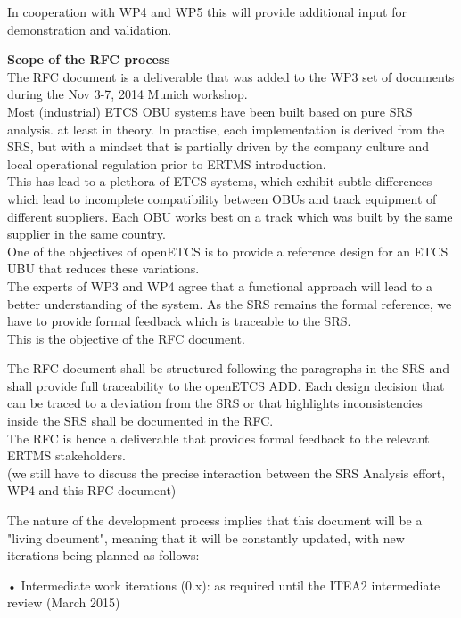 In cooperation with WP4 and WP5 this will provide additional input for demonstration and validation.



\textbf{Scope of the RFC process}\\


The RFC document is a deliverable that was added to the WP3 set of documents during the Nov 3-7, 2014 Munich workshop.\\

Most (industrial) ETCS OBU systems have been built based on pure SRS analysis. at least in theory. In practise, each implementation is derived from the SRS, but with a mindset that is partially driven by the company culture and local operational regulation prior to ERTMS introduction.\\
This has lead to a plethora of ETCS systems, which exhibit subtle differences which lead to incomplete compatibility between OBUs and track equipment of different suppliers. Each OBU works best on a track which was built by the same supplier in the same country.\\
One of the objectives of openETCS is to provide a reference design for an ETCS UBU that reduces these variations.\\
The experts of WP3 and WP4 agree that a functional approach will lead to a better understanding of the system. As the SRS remains the formal reference, we have to provide formal feedback which is traceable to the SRS.\\
This is the objective of the RFC document.

The RFC document shall be structured following the paragraphs in the SRS and shall provide full traceability to the openETCS ADD.
Each design decision that can be traced to a deviation from the SRS or that highlights inconsistencies inside the SRS shall be documented in the RFC.\\
The RFC is hence a deliverable that provides formal feedback to the relevant ERTMS stakeholders.\\

(we still have to discuss the precise interaction between the SRS Analysis effort, WP4 and this RFC document)

The nature of the development process implies that this document will be a "living document", meaning that it will be constantly updated, with new iterations being planned as follows:

•  Intermediate work iterations (0.x): as required until the ITEA2 intermediate review (March 2015)

